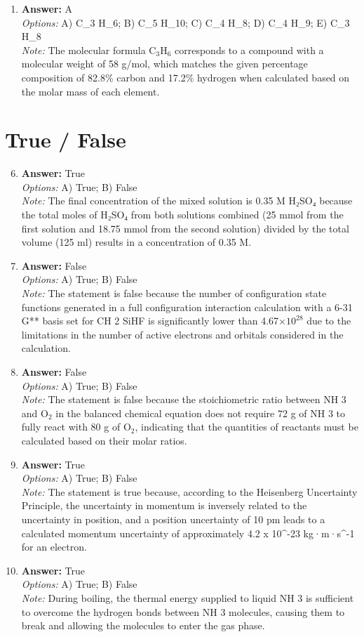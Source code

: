 \documentclass[12pt]{article}
\begin{document}
\begin{enumerate}[label=\arabic*.]
\item \textbf{Answer:} A
\\ \textit{Options:} A) C\_3 H\_6; B) C\_5 H\_10; C) C\_4 H\_8; D) C\_4 H\_9; E) C\_3 H\_8
\\ \textit{Note:} The molecular formula C$_{3}$H$_{6}$ corresponds to a compound with a molecular weight of 58 g/mol, which matches the given percentage composition of 82.8\% carbon and 17.2\% hydrogen when calculated based on the molar mass of each element.
\end{enumerate}

\section*{True / False}
\begin{enumerate}[label=\arabic*.]
\setcounter{enumi}{5}
\item \textbf{Answer:} True
\\ \textit{Options:} A) True; B) False
\\ \textit{Note:} The final concentration of the mixed solution is 0.35 M H₂SO₄ because the total moles of H₂SO₄ from both solutions combined (25 mmol from the first solution and 18.75 mmol from the second solution) divided by the total volume (125 ml) results in a concentration of 0.35 M.
\item \textbf{Answer:} False
\\ \textit{Options:} A) True; B) False
\\ \textit{Note:} The statement is false because the number of configuration state functions generated in a full configuration interaction calculation with a 6-31 G** basis set for CH 2 SiHF is significantly lower than 4.67×$10^28$ due to the limitations in the number of active electrons and orbitals considered in the calculation.
\item \textbf{Answer:} False
\\ \textit{Options:} A) True; B) False
\\ \textit{Note:} The statement is false because the stoichiometric ratio between NH 3 and O$_{2}$ in the balanced chemical equation does not require 72 g of NH 3 to fully react with 80 g of O$_{2}$, indicating that the quantities of reactants must be calculated based on their molar ratios.
\item \textbf{Answer:} True
\\ \textit{Options:} A) True; B) False
\\ \textit{Note:} The statement is true because, according to the Heisenberg Uncertainty Principle, the uncertainty in momentum is inversely related to the uncertainty in position, and a position uncertainty of 10 pm leads to a calculated momentum uncertainty of approximately 4.2 x 10^-23 kg·m·s^-1 for an electron.
\item \textbf{Answer:} True
\\ \textit{Options:} A) True; B) False
\\ \textit{Note:} During boiling, the thermal energy supplied to liquid NH 3 is sufficient to overcome the hydrogen bonds between NH 3 molecules, causing them to break and allowing the molecules to enter the gas phase.
\end{enumerate}
\end{document}
